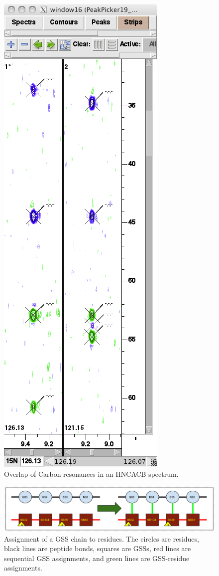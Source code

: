 \begin{figure}
  \includegraphics[scale=0.35]{figures/hncacb_overlap}
  \caption{Overlap of Carbon resonances in an HNCACB spectrum.}
  \label{hncacb_overlap}
\end{figure}

\begin{figure}
  \includegraphics[scale=0.45]{figures/ss-residue}
  \caption[Assignment of a GSS chain to residues]
          {Assignment of a GSS chain to residues.  The circles are residues,
           black lines are peptide bonds, squares are GSSs, red lines are 
           sequential GSS assignments, and green lines are GSS-residue 
           assignments.}
  \label{ss-residue}
\end{figure}

